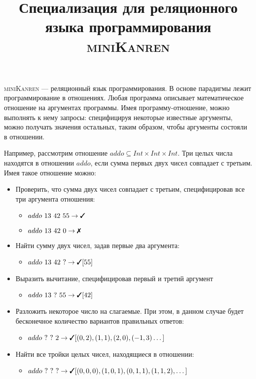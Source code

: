 \documentclass{article}
\newcommand{\cmark}{\ding{51}}
\newcommand{\xmark}{\ding{55}}
\newcommand{\miniKanren}{\textsc{miniKanren }}
\begin{document}
\title{Специализация для реляционного языка программирования \miniKanren}

\maketitle

\miniKanren — реляционный язык программирования. В основе парадигмы лежит программирование в отношениях. Любая программа описывает математическое отношение на аргументах программы. Имея программу-отношение, можно выполнять к нему запросы: специфицируя некоторые известные аргументы, можно получать значения остальных, таким образом, чтобы аргументы состояли в отношении. 

Например, рассмотрим отношение $addo \subseteq Int \times Int \times Int$. Три целых числа находятся в отношении $addo$, если сумма первых двух чисел совпадает с третьим. Имея  такое отношение можно: 

\begin{itemize}
    \item Проверить, что сумма двух чисел совпадает с третьим, специфицировав все три аргумента отношения:
    \begin{itemize}
        \item $addo \ 13 \ 42 \ 55 \to \text{\cmark}$
        \item $addo \ 13 \ 42 \ 0 \to \text{\xmark}$ 
    \end{itemize}

    \item Найти сумму двух чисел, задав первые два аргумента:
    \begin{itemize}
        \item $addo \ 13 \ 42 \ ? \to \text{\cmark} [55]$
    \end{itemize}

    \item Выразить вычитание, специфицировав первый и третий аргумент
    \begin{itemize}
        \item $addo \ 13 \ ? \ 55 \to \text{\cmark} [42]$
    \end{itemize}
    
    \item Разложить некоторое число на слагаемые. При этом, в данном случае будет бесконечное количество вариантов правильных ответов: 
    \begin{itemize}
        \item $addo \ ? \ ? \ 2 \to \text{\cmark} [(0, 2), (1, 1), (2, 0), (-1, 3) \dots]$
    \end{itemize}

    \item Найти все тройки целых чисел,  находящиеся в отношении: 
    \begin{itemize}
        \item $addo \ ? \ ? \ ? \to \text{\cmark} [(0, 0, 0), (1, 0, 1), (0, 1, 1), (1, 1, 2), \dots]$ 
    \end{itemize}
\end{itemize}
\end{document}

